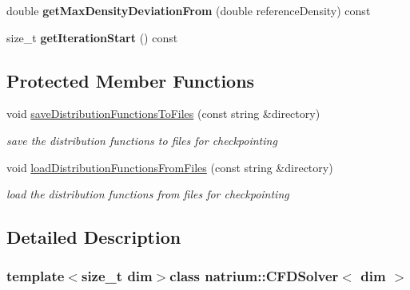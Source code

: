 \begin{DoxyCompactItemize}
\item 
\hypertarget{classnatrium_1_1CFDSolver_ade641431988a82cb47d88a9d600e1c92}{double {\bfseries get\-Max\-Density\-Deviation\-From} (double reference\-Density) const }\label{classnatrium_1_1CFDSolver_ade641431988a82cb47d88a9d600e1c92}

\item 
\hypertarget{classnatrium_1_1CFDSolver_a33c4bfd63b8d457a5bc15f0c0da02c38}{size\-\_\-t {\bfseries get\-Iteration\-Start} () const }\label{classnatrium_1_1CFDSolver_a33c4bfd63b8d457a5bc15f0c0da02c38}

\end{DoxyCompactItemize}
\subsection*{Protected Member Functions}
\begin{DoxyCompactItemize}
\item 
\hypertarget{classnatrium_1_1CFDSolver_a9a2592ea549fa10427c84f0a1e380c1e}{void \hyperlink{classnatrium_1_1CFDSolver_a9a2592ea549fa10427c84f0a1e380c1e}{save\-Distribution\-Functions\-To\-Files} (const string \&directory)}\label{classnatrium_1_1CFDSolver_a9a2592ea549fa10427c84f0a1e380c1e}

\begin{DoxyCompactList}\small\item\em save the distribution functions to files for checkpointing \end{DoxyCompactList}\item 
\hypertarget{classnatrium_1_1CFDSolver_a42245d22e289d079a3b06a0c26f50050}{void \hyperlink{classnatrium_1_1CFDSolver_a42245d22e289d079a3b06a0c26f50050}{load\-Distribution\-Functions\-From\-Files} (const string \&directory)}\label{classnatrium_1_1CFDSolver_a42245d22e289d079a3b06a0c26f50050}

\begin{DoxyCompactList}\small\item\em load the distribution functions from files for checkpointing \end{DoxyCompactList}\end{DoxyCompactItemize}


\subsection{Detailed Description}
\subsubsection*{template$<$size\-\_\-t dim$>$class natrium\-::\-C\-F\-D\-Solver$<$ dim $>$}

